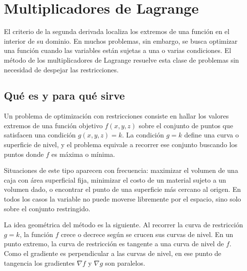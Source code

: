 \section{Multiplicadores de Lagrange}

El criterio de la segunda derivada localiza los extremos de una función en el interior de su dominio. En muchos problemas, sin embargo, se busca optimizar una función cuando las variables están sujetas a una o varias condiciones. El método de los multiplicadores de Lagrange resuelve esta clase de problemas sin necesidad de despejar las restricciones.

\subsection{Qué es y para qué sirve}

Un problema de optimización con restricciones consiste en hallar los valores extremos de una función objetivo $f(x, y, z)$ sobre el conjunto de puntos que satisfacen una condición $g(x, y, z) = k$. La condición $g = k$ define una curva o superficie de nivel, y el problema equivale a recorrer ese conjunto buscando los puntos donde $f$ es máxima o mínima.

Situaciones de este tipo aparecen con frecuencia: maximizar el volumen de una caja con área superficial fija, minimizar el costo de un material sujeto a un volumen dado, o encontrar el punto de una superficie más cercano al origen. En todos los casos la variable no puede moverse libremente por el espacio, sino solo sobre el conjunto restringido.

La idea geométrica del método es la siguiente. Al recorrer la curva de restricción $g = k$, la función $f$ crece o decrece según se crucen sus curvas de nivel. En un punto extremo, la curva de restricción es tangente a una curva de nivel de $f$. Como el gradiente es perpendicular a las curvas de nivel, en ese punto de tangencia los gradientes $\nabla f$ y $\nabla g$ son paralelos.

